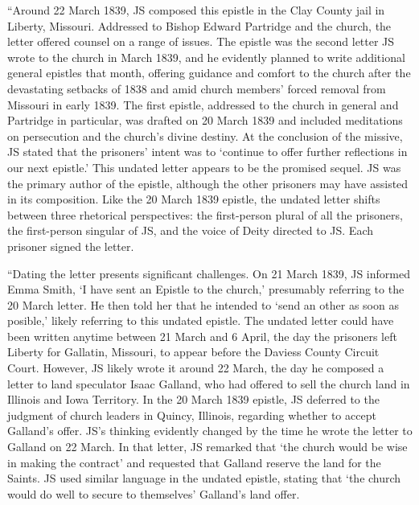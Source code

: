 			``Around 22 March 1839, JS composed this epistle in the Clay County jail in Liberty, Missouri. Addressed to Bishop Edward Partridge and the church, the letter offered counsel on a range of issues. The epistle was the second letter JS wrote to the church in March 1839, and he evidently planned to write additional general epistles that month, offering guidance and comfort to the church after the devastating setbacks of 1838 and amid church members' forced removal from Missouri in early 1839. The first epistle, addressed to the church in general and Partridge in particular, was drafted on 20 March 1839 and included meditations on persecution and the church's divine destiny. At the conclusion of the missive, JS stated that the prisoners' intent was to `continue to offer further reflections in our next epistle.' This undated letter appears to be the promised sequel. JS was the primary author of the epistle, although the other prisoners may have assisted in its composition. Like the 20 March 1839 epistle, the undated letter shifts between three rhetorical perspectives: the first-person plural of all the prisoners, the first-person singular of JS, and the voice of Deity directed to JS. Each prisoner signed the letter.
			
			``Dating the letter presents significant challenges. On 21 March 1839, JS informed Emma Smith, `I have sent an Epistle to the church,' presumably referring to the 20 March letter. He then told her that he intended to `send an other as soon as posible,' likely referring to this undated epistle. The undated letter could have been written anytime between 21 March and 6 April, the day the prisoners left Liberty for Gallatin, Missouri, to appear before the Daviess County Circuit Court. However, JS likely wrote it around 22 March, the day he composed a letter to land speculator Isaac Galland, who had offered to sell the church land in Illinois and Iowa Territory. In the 20 March 1839 epistle, JS deferred to the judgment of church leaders in Quincy, Illinois, regarding whether to accept Galland's offer. JS's thinking evidently changed by the time he wrote the letter to Galland on 22 March. In that letter, JS remarked that `the church would be wise in making the contract' and requested that Galland reserve the land for the Saints. JS used similar language in the undated epistle, stating that `the church would do well to secure to themselves' Galland's land offer.
			
